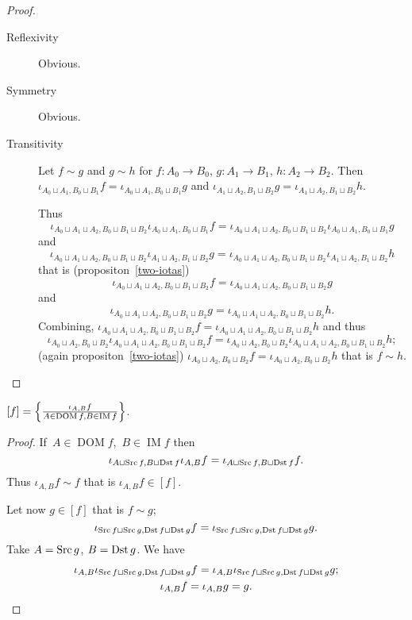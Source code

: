 \begin{proof}
~
\begin{description}
\item[Reflexivity] Obvious.

\item[Symmetry] Obvious.

\item[Transitivity] Let $f\sim g$ and $g\sim h$ for
$f:A_0\to B_0$, $g:A_1\to B_1$, $h:A_2\to B_2$.
Then
$\iota_{A_0\sqcup A_1,B_0\sqcup B_1}f=\iota_{A_0\sqcup A_1,B_0\sqcup B_1}g$ and
$\iota_{A_1\sqcup A_2,B_1\sqcup B_2}g=\iota_{A_1\sqcup A_2,B_1\sqcup B_2}h$.

Thus
\[\iota_{A_0\sqcup A_1\sqcup A_2,B_0\sqcup B_1\sqcup B_2}\iota_{A_0\sqcup A_1,B_0\sqcup B_1}f=\iota_{A_0\sqcup A_1\sqcup A_2,B_0\sqcup B_1\sqcup B_2}\iota_{A_0\sqcup A_1,B_0\sqcup B_1}g\] and
\[\iota_{A_0\sqcup A_1\sqcup A_2,B_0\sqcup B_1\sqcup B_2}\iota_{A_1\sqcup A_2,B_1\sqcup B_2}g=\iota_{A_0\sqcup A_1\sqcup A_2,B_0\sqcup B_1\sqcup B_2}\iota_{A_1\sqcup A_2,B_1\sqcup B_2}h\]
that is (propositon~\ref{two-iotas})
\[\iota_{A_0\sqcup A_1\sqcup A_2,B_0\sqcup B_1\sqcup B_2}f=\iota_{A_0\sqcup A_1\sqcup A_2,B_0\sqcup B_1\sqcup B_2}g\]
and
\[\iota_{A_0\sqcup A_1\sqcup A_2,B_0\sqcup B_1\sqcup B_2}g=\iota_{A_0\sqcup A_1\sqcup A_2,B_0\sqcup B_1\sqcup B_2}h.\]
Combining,
$\iota_{A_0\sqcup A_1\sqcup A_2,B_0\sqcup B_1\sqcup B_2}f=\iota_{A_0\sqcup A_1\sqcup A_2,B_0\sqcup B_1\sqcup B_2}h$ and thus
\[\iota_{A_0\sqcup A_2,B_0\sqcup B_2}\iota_{A_0\sqcup A_1\sqcup A_2,B_0\sqcup B_1\sqcup B_2}f=\iota_{A_0\sqcup A_2,B_0\sqcup B_2}\iota_{A_0\sqcup A_1\sqcup A_2,B_0\sqcup B_1\sqcup B_2}h;\]
(again propositon~\ref{two-iotas}) $\iota_{A_0\sqcup A_2,B_0\sqcup B_2}f=\iota_{A_0\sqcup A_2,B_0\sqcup B_2}h$
that is $f\sim h$.
\end{description}
\end{proof}

\begin{prop}
$[f] = \left\{ \frac{\iota_{A,B}f}{
A\in\operatorname{DOM}f,B\in\operatorname{IM}f}\right\}$.
\end{prop}

\begin{proof}
If~$A\in\operatorname{DOM}f$,~$B\in\operatorname{IM}f$
then
\[\iota_{A\sqcup\operatorname{Src} f,B\sqcup\operatorname{Dst} f}\iota_{A,B}f =
\iota_{A\sqcup\operatorname{Src} f,B\sqcup\operatorname{Dst} f}f.\] Thus
$\iota_{A,B}f\sim f$ that is $\iota_{A,B}f\in[f]$.

Let now $g\in[f]$ that is $f\sim g$;
\[\iota_{\operatorname{Src} f\sqcup\operatorname{Src} g,\operatorname{Dst} f\sqcup\operatorname{Dst} g}f=
\iota_{\operatorname{Src} f\sqcup\operatorname{Src} g,\operatorname{Dst} f\sqcup\operatorname{Dst} g}g.\]
Take $A=\operatorname{Src} g$, $B=\operatorname{Dst} g$. We have
\begin{gather*}
\iota_{A,B}\iota_{\operatorname{Src} f\sqcup\operatorname{Src} g,\operatorname{Dst} f\sqcup\operatorname{Dst} g}f=
\iota_{A,B}\iota_{\operatorname{Src} f\sqcup\operatorname{Src} g,\operatorname{Dst} f\sqcup\operatorname{Dst} g}g;\\
\iota_{A,B}f=\iota_{A,B}g = g.
\end{gather*}
\end{proof}

